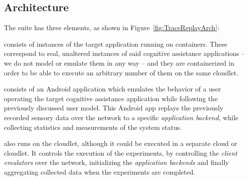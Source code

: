 
\subsection{Architecture}

The suite has three elements, as shown in Figure~\ref{fig:TraceReplayArch}:

\begin{description}[labelindent=\parindent, listparindent=\parindent, style=unboxed, leftmargin=0cm]
  \item [The application backend] consists of instances of the target application running on \textcite{docker} containers. 
  These correspond to real, unaltered instances of said cognitive assistance applications -- we do not model or emulate them in any way -- and they are containerized in order to be able to execute an arbitrary number of them on the same cloudlet.
  \item [The client emulator] consists of an Android application which emulates the behavior of a user operating the target cognitive assistance application while following the previously discussed user model.
  This Android app replays the previously recorded sensory data over the network to a specific \emph{application backend}, while collecting statistics and measurements of the system status. 
  \item [The control backend] also runs on the cloudlet, although it could be executed in a separate cloud or cloudlet. It controls the execution of the experiments, by controlling the \emph{client emulators} over the network, initializing the \emph{application backends} and finally aggregating collected data when the experiments are completed. 
\end{description}

